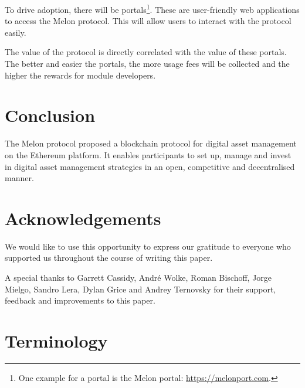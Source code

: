 \documentclass[9pt,oneside]{amsart}
\theoremstyle{plain}
\begin{document}
\begin{multicols}{2}
    To drive adoption, there will be portals\footnote{One example for a portal is the Melon portal: \url{https://melonport.com}.}. These are user-friendly web applications to access the Melon protocol. This will allow users to interact with the protocol easily.
    
    The value of the protocol is directly correlated with the value of these portals. The better and easier the portals, the more usage fees will be collected and the higher the rewards for module developers.
    
    \section{Conclusion}\label{sec:conc}
    
    The Melon protocol proposed a blockchain protocol for digital asset management on the Ethereum platform. It enables participants to set up, manage and invest in digital asset management strategies in an open, competitive and decentralised manner.
    
    \section{Acknowledgements}
    
    We would like to use this opportunity to express our gratitude to everyone who supported us throughout the course of writing this paper.
    
    A special thanks to Garrett Cassidy, André Wolke, Roman Bischoff, Jorge Mielgo, Sandro Lera, Dylan Grice and Andrey Ternovsky for their support, feedback and improvements to this paper.
    
    
    
    \end{multicols}
    
    \appendix
    
    \section{Terminology}\label{app:term}
    
\end{document}
